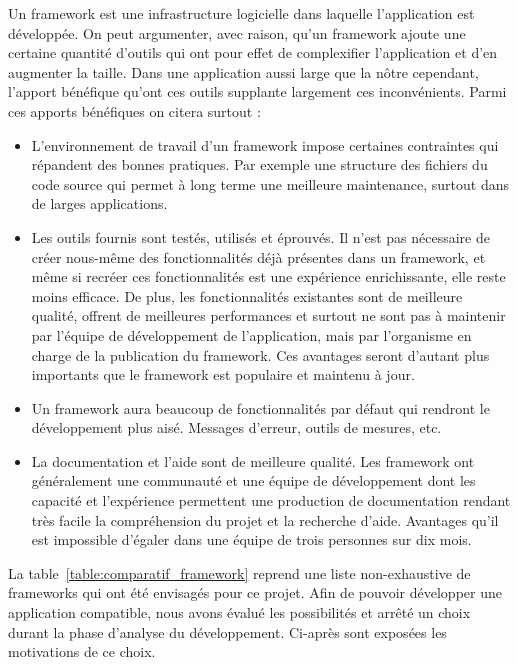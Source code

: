 \documentclass{EPL-master-thesis-covers-FR}
\begin{document}
				Un framework est une infrastructure logicielle dans laquelle l'application est développée. On peut argumenter, avec raison, qu'un framework ajoute une certaine quantité d'outils qui ont pour effet de complexifier l'application et d'en augmenter la taille. Dans une application aussi large que la nôtre cependant, l'apport bénéfique qu'ont ces outils supplante largement ces inconvénients. Parmi ces apports bénéfiques on citera surtout :
				\begin{itemize}
					\item L'environnement de travail d'un framework impose certaines contraintes qui répandent des bonnes pratiques. Par exemple une structure des fichiers du code source qui permet à long terme une meilleure maintenance, surtout dans de larges applications.
					\item Les outils fournis sont testés, utilisés et éprouvés. Il n'est pas nécessaire de créer nous-même des fonctionnalités déjà présentes dans un framework, et même si recréer ces fonctionnalités est une expérience enrichissante, elle reste moins efficace. De plus, les fonctionnalités existantes sont de meilleure qualité, offrent de meilleures performances et surtout ne sont pas à maintenir par l'équipe de développement de l'application, mais par l'organisme en charge de la publication du framework. Ces avantages seront d'autant plus importants que le framework est populaire et maintenu à jour.
					\item Un framework aura beaucoup de fonctionnalités par défaut qui rendront le développement plus aisé. Messages d'erreur, outils de mesures, etc.
					\item La documentation et l'aide sont de meilleure qualité. Les framework ont généralement une communauté et une équipe de développement dont les capacité et l'expérience permettent une production de documentation rendant très facile la compréhension du projet et la recherche d'aide. Avantages qu'il est impossible d'égaler dans une équipe de trois personnes sur dix mois.
				\end{itemize}

				La table~\ref{table:comparatif_framework} reprend une liste non-exhaustive de frameworks qui ont été envisagés pour ce projet. Afin de pouvoir développer une application compatible, nous avons évalué les possibilités et arrêté un choix durant la phase d'analyse du développement. Ci-après sont exposées les motivations de ce choix.
\end{document}
